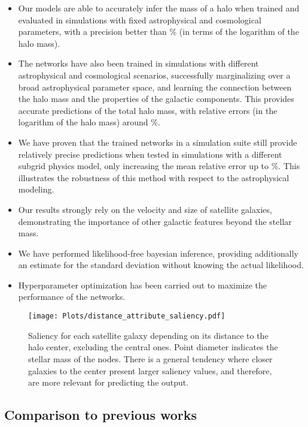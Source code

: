 \documentclass[twocolumn]{aastex631}
\begin{document}
\begin{itemize}
    \item Our models are able to accurately infer the mass of a halo when trained and evaluated in simulations with fixed astrophysical and cosmological parameters, with a precision better than \% (in terms of the logarithm of the halo mass).
    \item The networks have also been trained in simulations with different astrophysical and cosmological scenarios, successfully marginalizing over a broad astrophysical parameter space, and learning the connection between the halo mass and the properties of the galactic components. This provides accurate predictions of the total halo mass, with relative errors (in the logarithm of the halo mass) around \%.
    \item We have proven that the trained networks in a simulation suite still provide relatively precise predictions when tested in simulations with a different subgrid physics model, only increasing the mean relative error up to \%. This illustrates the robustness of this method with respect to the astrophysical modeling.
    \item Our results strongly rely on the velocity and size of satellite galaxies, demonstrating the importance of other galactic features beyond the stellar mass.
    \item We have performed likelihood-free bayesian inference, providing additionally an estimate for the standard deviation without knowing the actual likelihood.
    \item Hyperparameter optimization has been carried out to maximize the performance of the networks. 
\end{itemize}


   

\begin{figure}[t!]
\begin{center}
\texttt{[image: Plots/distance\_attribute\_saliency.pdf]}
\caption{Saliency for each satellite galaxy depending on its distance to the halo center, excluding the central ones. Point diameter indicates the stellar mass of the nodes. There is a general tendency where closer galaxies to the center present larger saliency values, and therefore, are more relevant for predicting the output.}
\label{fig:distances}
\end{center}
\end{figure}

\subsection{Comparison to previous works}
\end{document}
